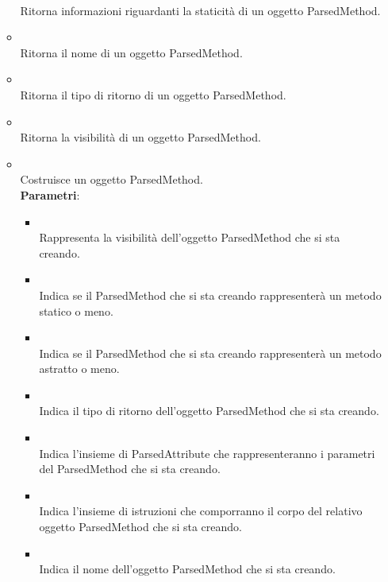 \begin{itemize}
\begin{itemize}
\\ Ritorna informazioni riguardanti la staticità di un oggetto ParsedMethod.
\item {}
\\ Ritorna il nome di un oggetto ParsedMethod.
\item {}
\\ Ritorna il tipo di ritorno di un oggetto ParsedMethod.
\item {}
\\ Ritorna la visibilità di un oggetto ParsedMethod.
\item {}
\\ Costruisce un oggetto ParsedMethod.
\\ \textbf{Parametri}:
\begin{itemize}
\item {}
\\ Rappresenta la visibilità dell'oggetto ParsedMethod che si sta creando.
\item {}
\\ Indica se il ParsedMethod che si sta creando rappresenterà un metodo statico o meno.
\item {}
\\ Indica se il ParsedMethod che si sta creando rappresenterà un metodo astratto o meno.
\item {}
\\ Indica il tipo di ritorno dell'oggetto ParsedMethod che si sta creando.
\item {}
\\ Indica l'insieme di ParsedAttribute che rappresenteranno i parametri del ParsedMethod che si sta creando.
\item {}
\\ Indica l'insieme di istruzioni che comporranno il corpo del relativo oggetto ParsedMethod che si sta creando.
\item {}
\\ Indica il nome dell'oggetto ParsedMethod che si sta creando.
\end{itemize}

\end{itemize}
\end{itemize}
